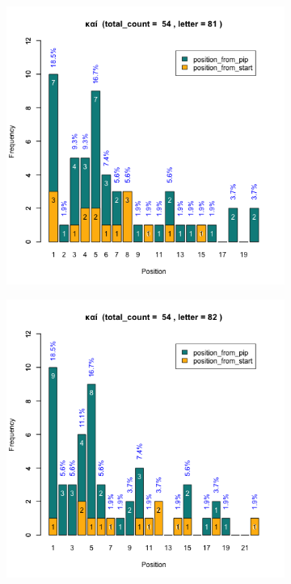 \documentclass[a4paper]{article}
\begin{document}
\begin{figure}
\begin{subfigure}{0.45\textwidth}
\centering
\includegraphics[width=1\linewidth]{../../data/output/peter_R_par/plots/par3_lt81.png}
\end{subfigure}
\begin{subfigure}{0.45\textwidth}
\centering
\includegraphics[width=1\linewidth]{../../data/output/peter_R_par/plots/par3_lt82.png}
\end{subfigure}
\end{figure}
\end{document}
